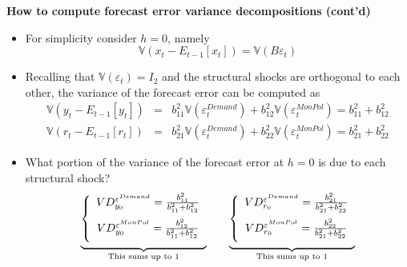 \documentclass[10pt,english,t,aspectratio=169,ignorenonframetext]{beamer}
\begin{document}
\begin{frame}
{\textbf{How to compute forecast error variance decompositions (cont'd)}}%
\vspace{-.15cm}

\begin{itemize}
\item For simplicity consider $h=0$, namely%
\begin{equation*}
\mathbb{V}\left( x_{t}-E_{t-1}[x_{t}]\right) =\mathbb{V}\left( B\varepsilon
_{t}\right)
\end{equation*}%
\vspace{-.1cm}

\item Recalling that $\mathbb{V}\left( \varepsilon _{t}\right) =I_{2}$ and
the structural shocks are orthogonal to each other, the variance of the
forecast error can be computed as%
\begin{eqnarray*}
\mathbb{V}\left( y_{t}-E_{t-1}[y_{t}]\right) &=&b_{11}^{2}\mathbb{V}\left(
\varepsilon _{t}^{Demand}\right) +b_{12}^{2}\mathbb{V}\left( \varepsilon
_{t}^{MonPol}\right) =b_{11}^{2}+b_{12}^{2} \\
\mathbb{V}\left( r_{t}-E_{t-1}[r_{t}]\right) &=&b_{21}^{2}\mathbb{V}\left(
\varepsilon _{t}^{Demand}\right) +b_{22}^{2}\mathbb{V}\left( \varepsilon
_{t}^{MonPol}\right) =b_{21}^{2}+b_{22}^{2}
\end{eqnarray*}%
\vspace{-.1cm}

\item What portion of the variance of the forecast error at $h=0$ is due to
each structural shock? 
\begin{equation*}
\underset{\text{This sums up to 1}}{\underbrace{\left\{ 
\begin{array}{c}
VD_{y_{0}}^{\varepsilon ^{Demand}}=\frac{b_{11}^{2}}{b_{11}^{2}+b_{12}^{2}}%
\medskip \\ 
VD_{y_{0}}^{\varepsilon ^{MonPol}}=\frac{b_{12}^{2}}{b_{11}^{2}+b_{12}^{2}}%
\medskip%
\end{array}%
\right. }}\ \ \ \ \ \ \underset{\text{This sums up to 1}}{\underbrace{%
\left\{ 
\begin{array}{c}
VD_{r_{0}}^{\varepsilon ^{Demand}}=\frac{b_{21}^{2}}{b_{21}^{2}+b_{22}^{2}}%
\medskip \\ 
VD_{r_{0}}^{\varepsilon ^{MonPol}}=\frac{b_{22}^{2}}{b_{21}^{2}+b_{22}^{2}}%
\medskip%
\end{array}%
\right. }}
\end{equation*}
\end{itemize}
\end{frame}
\end{document}
